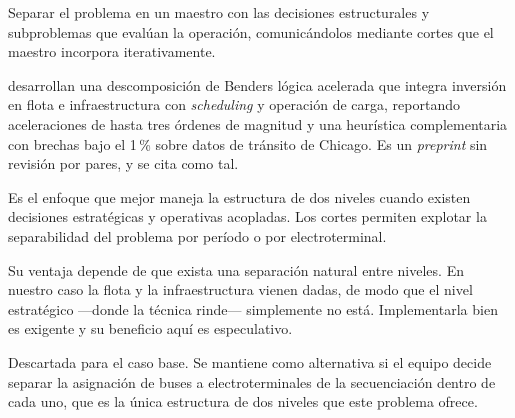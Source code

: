 \documentclass[11pt,a4paper,parskip=half]{scrartcl}
\begin{document}
\begin{campos}
\item[En qué consiste] Separar el problema en un maestro con las decisiones estructurales y subproblemas que evalúan la operación, comunicándolos mediante cortes que el maestro incorpora iterativamente.
\item[Evidencia] \citet{legault_bendersfleetelectrification_2025} desarrollan una descomposición de Benders lógica acelerada que integra inversión en flota e infraestructura con \textit{scheduling} y operación de carga, reportando aceleraciones de hasta tres órdenes de magnitud y una heurística complementaria con brechas bajo el 1\,\% sobre datos de tránsito de Chicago. Es un \textit{preprint} sin revisión por pares, y se cita como tal.
\item[Ventajas] Es el enfoque que mejor maneja la estructura de dos niveles cuando existen decisiones estratégicas y operativas acopladas. Los cortes permiten explotar la separabilidad del problema por período o por electroterminal.
\item[Desventajas] Su ventaja depende de que exista una separación natural entre niveles. En nuestro caso la flota y la infraestructura vienen dadas, de modo que el nivel estratégico —donde la técnica rinde— simplemente no está. Implementarla bien es exigente y su beneficio aquí es especulativo.
\item[Aplicabilidad] Descartada para el caso base. Se mantiene como alternativa si el equipo decide separar la asignación de buses a electroterminales de la secuenciación dentro de cada uno, que es la única estructura de dos niveles que este problema ofrece.
\end{campos}
\end{document}
